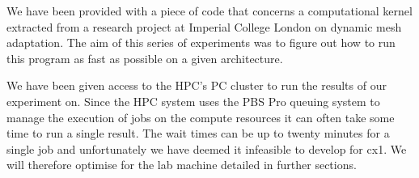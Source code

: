 We have been provided with a piece of code that concerns a computational kernel extracted from a research project at Imperial College London on dynamic mesh adaptation\cite{pragmatic}.
The aim of this series of experiments was to figure out how to run this program as fast as possible on a given architecture.

We have been given access to the HPC's PC cluster to run the results of our experiment on.
Since the HPC system uses the PBS Pro queuing system to manage the execution of jobs on the compute resources it can often take some time to run a single result. The wait times can be up to twenty minutes for a single job and unfortunately we have deemed it infeasible to develop for cx1. We will therefore optimise for the lab machine detailed in further sections.